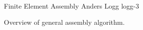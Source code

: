               {Finite Element Assembly}
              {Anders Logg}
              {logg-3}

Overview of general assembly algorithm.

